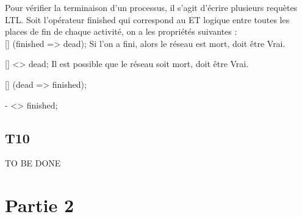 \documentclass{report}
\begin{document}
Pour vérifier la terminaison d'un processus, il s'agit d'écrire plusieurs requètes LTL.
Soit l'opérateur finished qui correspond au ET logique entre toutes les places de fin de chaque activité, on a les propriétés suivantes :\\

[] (finished => dead);
Si l'on a fini, alors le réseau est mort, doit être Vrai.

[] <> dead;
Il est possible que le réseau soit mort, doit être Vrai.

[] (dead => finished);

- <> finished;


\section{T10}
TO BE DONE


\chapter{Partie 2}


\end{document}
